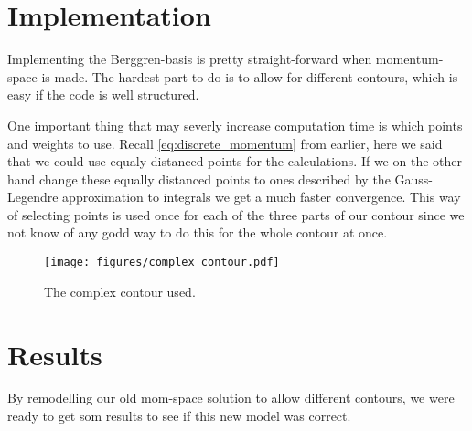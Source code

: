 \section{Implementation}
Implementing the Berggren-basis is pretty straight-forward when momentum-space is made.
The hardest part to do is to allow for different contours, which is easy if the code is well structured.

One important thing that may severly increase computation time is which points and weights to use.
Recall \cref{eq:discrete_momentum} from earlier, here we said that we could use equaly distanced points for the calculations.
If we on the other hand change these equally distanced points to ones described by the Gauss-Legendre approximation to integrals we get a much faster convergence.
This way of selecting points is used once for each of the three parts of our contour since we not know of any godd way to do this for the whole contour at once.

\begin{figure}
  \centering
    \texttt{[image: figures/complex\_contour.pdf]}
  \caption{The complex contour used.}
  \label{fig:contour}
\end{figure}

\section{Results}
By remodelling our old mom-space solution to allow different contours, we were ready to get som results to see if this new model was correct.
